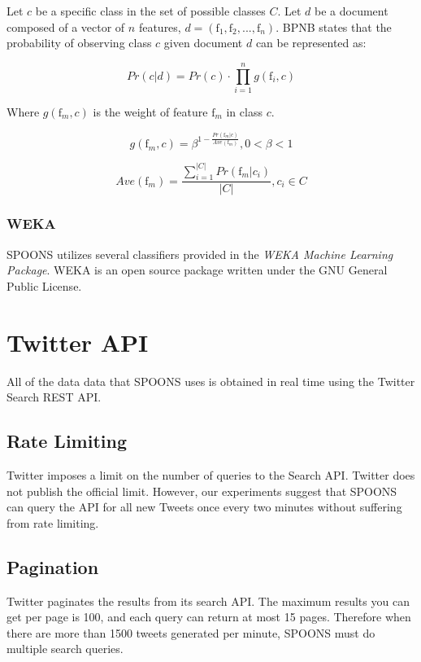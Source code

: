 \documentclass[12pt]{ucthesis}
\begin{document}
Let $c$ be a specific class in the set of possible classes $C$.
Let $d$ be a document composed of a vector of $n$ features, $d = (\textrm{f}_{1}, \textrm{f}_{2}, ..., \textrm{f}_{n})$.
BPNB states that the probability of observing class $c$ given document $d$
can be represented as:

\begin{equation}
   Pr(c|d) = Pr(c) \cdot \prod_{i = 1}^{n}g(\textrm{f}_{i},c)
\end{equation}

Where $g(\textrm{f}_{m}, c)$ is the weight of feature $\textrm{f}_m$ in class $c$.

\begin{equation}
   g(\textrm{f}_m, c) = \beta^{1 - \frac{Pr(\textrm{f}_m|c)}{Ave(\textrm{f}_m)}}, 0 < \beta < 1
\end{equation}

\begin{equation}
   Ave(\textrm{f}_m) = \frac{\sum_{i=1}^{|C|} Pr(\textrm{f}_m|c_{i})}{|C|}, c_i \in C
\end{equation}

\subsection{WEKA}
\label{background-weka}
SPOONS utilizes several classifiers provided in the \textit{WEKA Machine Learning Package}.
WEKA is an open source package written under the GNU General Public License\cite{weka}.

\chapter{Twitter API}
\label{api}
All of the data data that SPOONS uses is obtained in real time using the Twitter Search REST API\cite{TwitterAPI}.

\section{Rate Limiting}
\label{api-rate-limit}
Twitter imposes a limit on the number of queries to the Search API. Twitter does not publish the official
limit. However, our experiments suggest that SPOONS can query the API for all new Tweets once every two minutes without
suffering from rate limiting.

\section{Pagination}
\label{api-pagination}
Twitter paginates the results from its search API. The maximum results you can get per page is 100, and each
query can return at most 15 pages. Therefore when there are more than 1500 tweets generated per minute,
SPOONS must do multiple search queries.
\end{document}
